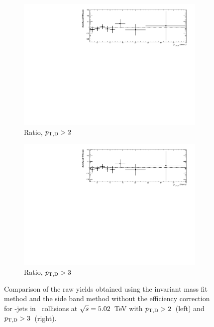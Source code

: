 \begin{figure}[bth]
\begin{subfigure}[c]{0.45\textwidth}
\includegraphics[width=\textwidth]{pPbplots/methodsComparison/DjetSpectraRatio_FASTwoSDD_noEff_ptD2}
\caption{Ratio, $p_{\mathrm{T,D}}>2$~\GeVc}
\end{subfigure}
\begin{subfigure}[d]{0.45\textwidth}
\includegraphics[width=\textwidth]{pPbplots/methodsComparison/DjetSpectraRatio_FASTwoSDD_noEff_ptD3}
\caption{Ratio, $p_{\mathrm{T,D}}>3$~\GeVc}
\end{subfigure}
\caption{Comparison of the raw yields obtained using the invariant mass fit method and the side band method without the efficiency correction for \Dstar-jets in \pPb\ collisions at $\sqrt{s}=5.02$~TeV with $p_{\mathrm{T,D}}>2$~\GeVc (left) and $p_{\mathrm{T,D}}>3$~\GeVc (right).}
\label{fig:pPbCompDirectJetSB_beforeEff}
\end{figure}

